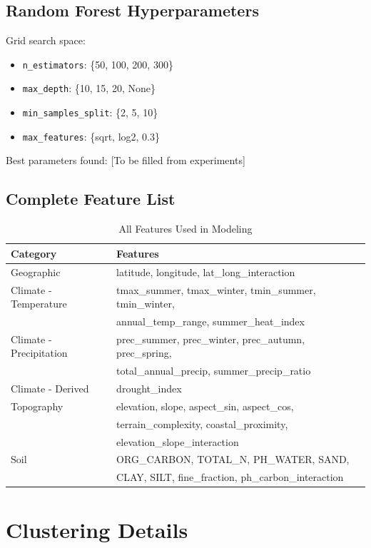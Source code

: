 \section*{Random Forest Hyperparameters}
Grid search space:
\begin{itemize}
    \item \texttt{n\_estimators}: \{50, 100, 200, 300\}
    \item \texttt{max\_depth}: \{10, 15, 20, None\}
    \item \texttt{min\_samples\_split}: \{2, 5, 10\}
    \item \texttt{max\_features}: \{sqrt, log2, 0.3\}
\end{itemize}

Best parameters found: [To be filled from experiments]

\section*{Complete Feature List}
\begin{table}[H]
\centering
\caption{All Features Used in Modeling}
\begin{tabular}{|l|l|}
\hline
\textbf{Category} & \textbf{Features} \\
\hline
Geographic & latitude, longitude, lat\_long\_interaction \\
\hline
Climate - Temperature & tmax\_summer, tmax\_winter, tmin\_summer, tmin\_winter, \\
 & annual\_temp\_range, summer\_heat\_index \\
\hline
Climate - Precipitation & prec\_summer, prec\_winter, prec\_autumn, prec\_spring, \\
 & total\_annual\_precip, summer\_precip\_ratio \\
\hline
Climate - Derived & drought\_index \\
\hline
Topography & elevation, slope, aspect\_sin, aspect\_cos, \\
 & terrain\_complexity, coastal\_proximity, \\
 & elevation\_slope\_interaction \\
\hline
Soil & ORG\_CARBON, TOTAL\_N, PH\_WATER, SAND, \\
 & CLAY, SILT, fine\_fraction, ph\_carbon\_interaction \\
\hline
\end{tabular}
\end{table}

\chapter{Clustering Details}
\label{app:clustering}

